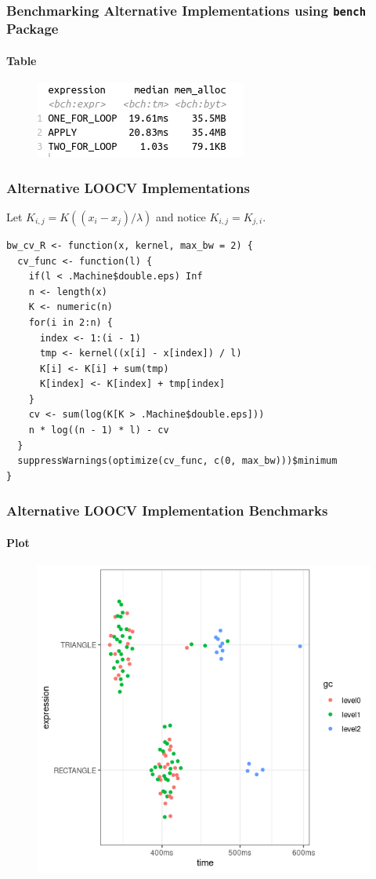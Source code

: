 \documentclass[aspectratio=169]{beamer}
\begin{document}
\begin{frame}
  \frametitle{Benchmarking Alternative Implementations using \texttt{bench} Package}
  \framesubtitle{Table}
  \begin{figure}
    \centering
    \includegraphics[scale = 0.7]{figure/R_FOR_APPLY_dens.png}
  \end{figure}
\end{frame}
\begin{frame}[fragile]
  \frametitle{Alternative LOOCV Implementations}
  Let $K_{i,j}=K((x_{i}-x_{j}) / \lambda)$ and notice $K_{i,j}=K_{j,i}$.\\
\begin{verbatim}
bw_cv_R <- function(x, kernel, max_bw = 2) {
  cv_func <- function(l) {
    if(l < .Machine$double.eps) Inf
    n <- length(x)
    K <- numeric(n)
    for(i in 2:n) {
      index <- 1:(i - 1)
      tmp <- kernel((x[i] - x[index]) / l)
      K[i] <- K[i] + sum(tmp)
      K[index] <- K[index] + tmp[index]
    }
    cv <- sum(log(K[K > .Machine$double.eps]))
    n * log((n - 1) * l) - cv
  }
  suppressWarnings(optimize(cv_func, c(0, max_bw)))$minimum
}
\end{verbatim}
\end{frame}
\begin{frame}
  \frametitle{Alternative LOOCV Implementation Benchmarks}
  \framesubtitle{Plot}
  \begin{figure}
    \centering
    \includegraphics[scale = 0.5]{figure/RecVsTri.png}
  \end{figure}
\end{frame}
\end{document}
